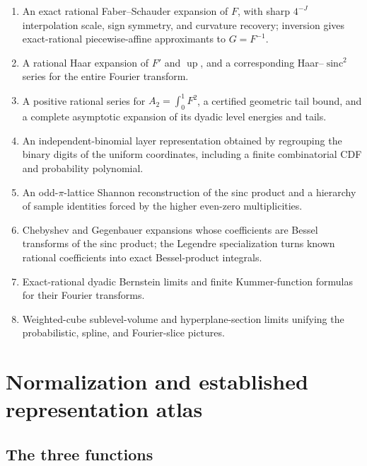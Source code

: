 \documentclass[11pt,oneside]{article}
\theoremstyle{definition}
\newcommand{\Up}{\operatorname{up}}
\newcommand{\sinc}{\operatorname{sinc}}
\begin{document}
\begin{enumerate}
\item An exact rational Faber--Schauder expansion of $F$, with sharp
      $4^{-J}$ interpolation scale, sign symmetry, and curvature recovery;
      inversion gives exact-rational piecewise-affine approximants to $G=F^{-1}$.
\item A rational Haar expansion of $F'$ and $\Up$, and a corresponding
      Haar--$\sinc^2$ series for the entire Fourier transform.
\item A positive rational series for $A_2=\int_0^1F^2$, a certified geometric
      tail bound, and a complete asymptotic expansion of its dyadic level
      energies and tails.
\item An independent-binomial layer representation obtained by regrouping
      the binary digits of the uniform coordinates, including a finite
      combinatorial CDF and probability polynomial.
\item An odd-$\pi$-lattice Shannon reconstruction of the sinc product and a
      hierarchy of sample identities forced by the higher even-zero
      multiplicities.
\item Chebyshev and Gegenbauer expansions whose coefficients are
      Bessel transforms of the sinc product; the Legendre specialization
      turns known rational coefficients into exact Bessel-product integrals.
\item Exact-rational dyadic Bernstein limits and finite Kummer-function
      formulas for their Fourier transforms.
\item Weighted-cube sublevel-volume and hyperplane-section limits unifying
      the probabilistic, spline, and Fourier-slice pictures.
\end{enumerate}

\section{Normalization and established representation atlas}
\label{p5:sec:atlas}

\subsection{The three functions}
\end{document}
